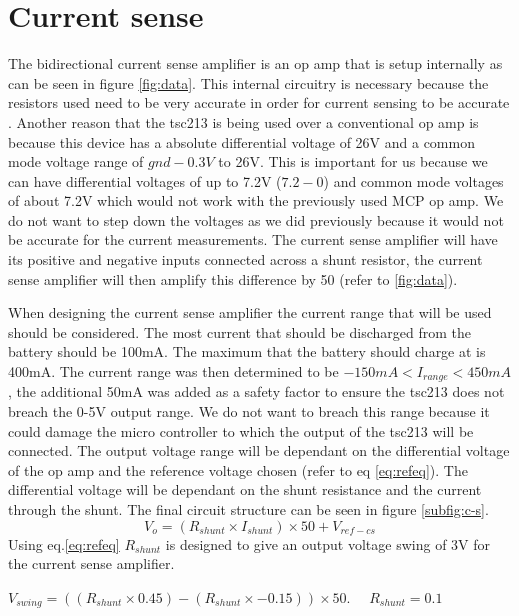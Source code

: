\newpage
\section{Current sense}
The bidirectional current sense amplifier is an op amp that is setup internally as can be seen in figure \ref{fig:data}. This internal circuitry is necessary because the resistors used need to be very accurate in order for current sensing to be accurate \cite{utube}. Another reason that the tsc213 is being used over a conventional op amp is because this device has a absolute differential voltage of 26V and a common mode voltage range of $gnd-0.3V$ to 26V. This is important for us because we can have differential voltages of up to 7.2V ($7.2-0$) and common mode voltages of about 7.2V which would not work with the previously used MCP op amp. We do not want to step down the voltages as we did previously because it would not be accurate for the current measurements. The current sense amplifier will have its positive and negative inputs connected across a shunt resistor, the current sense amplifier will then amplify this difference by 50 (refer to \ref{fig:data}).



When designing the current sense amplifier the current range that will be used should be considered. The most current that should be discharged from the battery should be 100mA. The maximum that the battery should charge at is 400mA. The current range was then determined to be $-150mA<I_{range}<450mA$, the additional 50mA was added as a safety factor to ensure the tsc213 does not breach the 0-5V output range. We do not want to breach this range because it could damage the micro controller to which the output of the tsc213 will be connected. The output voltage range will be dependant on the differential voltage of the op amp and the reference voltage chosen (refer to eq \ref{eq:refeq}). The differential voltage will be dependant on the shunt resistance and the current through the shunt. The final circuit structure can be seen in figure \ref{subfig:c-s}.
\begin{equation}
    V_o=(R_{shunt}\times I_{shunt})\times50+V_{ref-cs}
    \label{eq:refeq}
\end{equation}
Using eq.\ref{eq:refeq} $R_{shunt}$ is designed to give an output voltage swing of 3V for the current sense amplifier.
\begin{center}
    $V_{swing}=((R_{shunt}\times 0.45)-(R_{shunt}\times -0.15))\times 50$. \ \ $R_{shunt}=0.1$\textohm 
\end{center}

